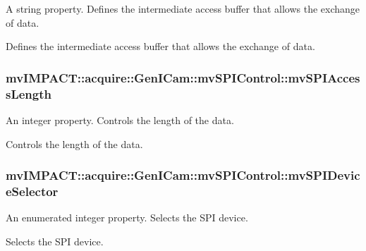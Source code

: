 A string property. Defines the intermediate access buffer that allows the exchange of data. 

Defines the intermediate access buffer that allows the exchange of data. \hypertarget{classmv_i_m_p_a_c_t_1_1acquire_1_1_gen_i_cam_1_1mv_s_p_i_control_a6558bcdf2437ea8e15ffc043ee235053}{
\subsubsection[{mv\+S\+P\+I\+Access\+Length}]{ mv\+I\+M\+P\+A\+C\+T\+::acquire\+::\+Gen\+I\+Cam\+::mv\+S\+P\+I\+Control\+::mv\+S\+P\+I\+Access\+Length}}\label{classmv_i_m_p_a_c_t_1_1acquire_1_1_gen_i_cam_1_1mv_s_p_i_control_a6558bcdf2437ea8e15ffc043ee235053}


An integer property. Controls the length of the data. 

Controls the length of the data. \hypertarget{classmv_i_m_p_a_c_t_1_1acquire_1_1_gen_i_cam_1_1mv_s_p_i_control_ab66a5a78e13a79a3cd365c57ad77b56a}{
\subsubsection[{mv\+S\+P\+I\+Device\+Selector}]{ mv\+I\+M\+P\+A\+C\+T\+::acquire\+::\+Gen\+I\+Cam\+::mv\+S\+P\+I\+Control\+::mv\+S\+P\+I\+Device\+Selector}}\label{classmv_i_m_p_a_c_t_1_1acquire_1_1_gen_i_cam_1_1mv_s_p_i_control_ab66a5a78e13a79a3cd365c57ad77b56a}


An enumerated integer property. Selects the S\+P\+I device. 

Selects the S\+P\+I device.

